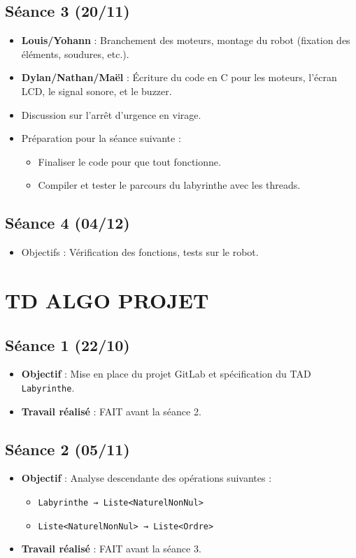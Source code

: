 \documentclass[a4paper,12pt]{article}
\begin{document}
\subsection{Séance 3 (20/11)}
\begin{itemize}
    \item \textbf{Louis/Yohann} : Branchement des moteurs, montage du robot (fixation des éléments, soudures, etc.).
    \item \textbf{Dylan/Nathan/Maël} : Écriture du code en C pour les moteurs, l'écran LCD, le signal sonore, et le buzzer.
    \item Discussion sur l'arrêt d'urgence en virage.
    \item Préparation pour la séance suivante :
    \begin{itemize}
        \item Finaliser le code pour que tout fonctionne.
        \item Compiler et tester le parcours du labyrinthe avec les threads.
    \end{itemize}
\end{itemize}

\subsection{Séance 4 (04/12)}
\begin{itemize}
    \item Objectifs : Vérification des fonctions, tests sur le robot.
\end{itemize}

\section{TD ALGO PROJET}

\subsection{Séance 1 (22/10)}
\begin{itemize}
    \item \textbf{Objectif} : Mise en place du projet GitLab et spécification du TAD \texttt{Labyrinthe}.
    \item \textbf{Travail réalisé} : FAIT avant la séance 2.
\end{itemize}

\subsection{Séance 2 (05/11)}
\begin{itemize}
    \item \textbf{Objectif} : Analyse descendante des opérations suivantes :
    \begin{itemize}
        \item \texttt{Labyrinthe → Liste<NaturelNonNul>}
        \item \texttt{Liste<NaturelNonNul> → Liste<Ordre>}
    \end{itemize}
    \item \textbf{Travail réalisé} : FAIT avant la séance 3.
\end{itemize}
\end{document}
